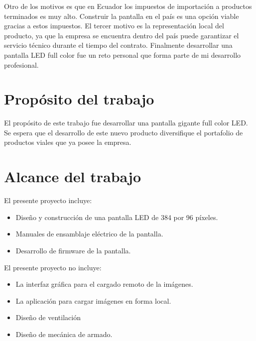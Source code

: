 Otro de los motivos es que en Ecuador los impuestos de importación a productos terminados es muy alto. Construir la pantalla en el país es una opción viable gracias a estos impuestos. El tercer motivo es la representación local del producto, ya que la empresa se encuentra dentro del país puede garantizar el servicio técnico durante el tiempo del contrato. Finalmente desarrollar una pantalla LED full color fue un reto personal que forma parte de mi desarrollo profesional. 



\section{Propósito del trabajo}
El propósito de este trabajo fue desarrollar una pantalla gigante full color LED. Se espera que el desarrollo de este nuevo producto diversifique el portafolio de productos viales que ya posee la empresa.

\pagebreak
\section{Alcance del trabajo}
El presente proyecto incluye:

\begin{itemize}
\item Diseño y construcción de una pantalla LED de 384 por 96 píxeles.
\item Manuales de ensamblaje eléctrico de la pantalla.
\item Desarrollo de firmware de la pantalla.


\end{itemize}

El presente proyecto no incluye:

 \begin{itemize}
\item La interfaz gráfica para el cargado remoto de la imágenes.
\item La aplicación para cargar imágenes en forma local.
\item Diseño de ventilación 
\item Diseño de mecánica de armado.

\end{itemize}




